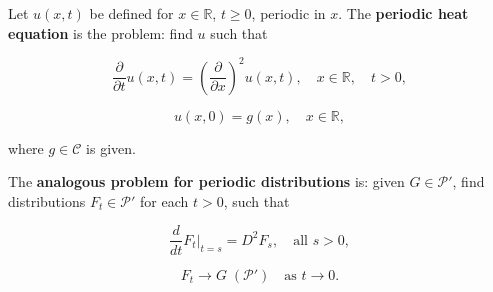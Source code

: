 Let $u(x,t)$ be defined for $x \in \mathbb{R}$, $t \geq 0$, periodic in $x$. The \textbf{periodic heat equation} is the problem: find $u$ such that

$$\frac{\partial}{\partial t} u(x, t) = \left( \frac{\partial}{\partial x} \right)^2 u(x, t), \quad x \in \mathbb{R}, \quad t > 0,$$

$$u(x, 0) = g(x), \quad x \in \mathbb{R},$$

where $g \in \mathcal{C}$ is given.

The \textbf{analogous problem for periodic distributions} is: given $G \in \mathcal{P}'$, find distributions $F_t \in \mathcal{P}'$ for each $t > 0$, such that

$$\frac{d}{dt} F_t \bigg|_{t=s} = D^2 F_s, \quad \text{all } s > 0,$$

$$F_t \rightarrow G \; (\mathcal{P}') \quad \text{as } t \rightarrow 0.$$

